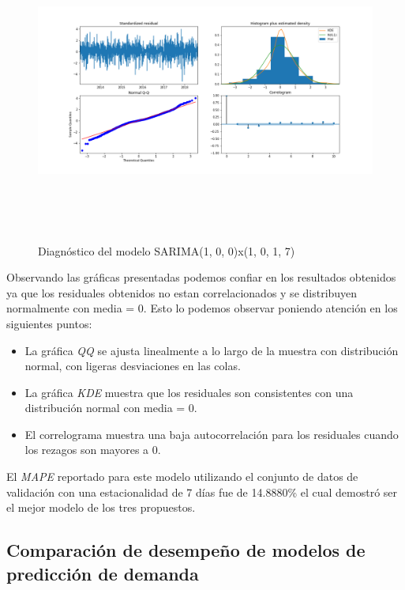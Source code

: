 \begin{figure}[H]
  \centering
      \includegraphics[width=\maxwidth,height=10cm]{figures/sarimax_summary.png}  
  \caption{Diagnóstico del modelo SARIMA(1, 0, 0)x(1, 0, 1, 7)}
\end{figure}


Observando las gráficas presentadas podemos confiar en los resultados obtenidos ya que los residuales obtenidos no estan correlacionados y se distribuyen normalmente con media = 0. Esto lo podemos observar poniendo atención en los siguientes puntos:

\begin{itemize}
  \item La gráfica \emph{QQ} se ajusta linealmente a lo largo de la muestra con distribución normal, con ligeras desviaciones en las colas.
  \item La gráfica \emph{KDE} muestra que los residuales son consistentes con una distribución normal con media = 0.
  \item El correlograma muestra una baja autocorrelación para los residuales cuando los rezagos son mayores a 0.
\end{itemize}

El \emph{MAPE} reportado para este modelo utilizando el conjunto de datos de validación con una estacionalidad de 7 días fue de 14.8880\% el cual demostró ser el mejor modelo de los tres propuestos.

\subsection*{Comparación de desempeño de modelos de predicción de demanda}

